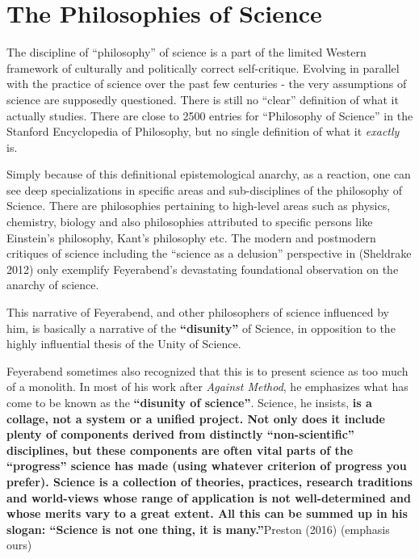 \section*{The Philosophies of Science}

The discipline of “philosophy” of science is a part of the limited Western framework of culturally and politically correct self-critique. Evolving in parallel with the practice of science over the past few centuries - the very assumptions of science are supposedly questioned. There is still no “clear” definition of what it actually studies. There are close to 2500 entries for “Philosophy of Science” in the Stanford Encyclopedia of Philosophy, but no single definition of what it \textit{exactly} is.

Simply because of this definitional epistemological anarchy, as a reaction, one can see deep specializations in specific areas and sub-disci\-plines of the philosophy of Science. There are philosophies pertaining to high-level areas such as physics, chemistry, biology and also philosophies attributed to specific persons like Einstein’s philosophy, Kant’s philosophy etc. The modern and postmodern critiques of science including the “science as a delusion” perspective in (Sheldrake 2012) only exemplify Feyerabend’s devastating foundational observation on the anarchy of science.

This narrative of Feyerabend, and other philosophers of science influenced by him, is basically a narrative of the \textbf{“disunity”} of Science, in opposition to the highly influential thesis of the Unity of Science.

\begin{myquote}
Feyerabend sometimes also recognized that this is to present science as too much of a monolith. In most of his work after \textit{Against Method}, he emphasizes what has come to be known as the \textbf{“disunity of science”}. Science, he insists, \textbf{is a collage, not a system or a unified project. Not only does it include plenty of components derived from distinctly “non-scientific” disciplines, but these components are often vital parts of the “progress” science has made (using whatever criterion of progress you prefer). Science is a collection of theories, practices, research traditions and world-views whose range of application is not well-determined and whose merits vary to a great extent. All this can be summed up in his slogan: “Science is not one thing, it is many.”}\hfill Preston (2016) (emphasis ours)
\end{myquote}

